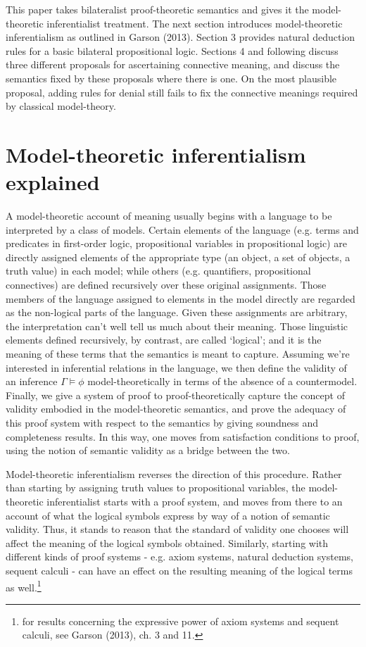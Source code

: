 \documentclass[]{article}
\begin{document}
This paper takes bilateralist proof-theoretic semantics and gives it the model-theoretic inferentialist treatment. The next section introduces model-theoretic inferentialism as outlined in Garson (2013). Section 3 provides natural deduction rules for a basic bilateral propositional logic. Sections 4 and following discuss three different proposals for ascertaining connective meaning, and discuss the semantics fixed by these proposals where there is one. On the most plausible proposal, adding rules for denial still fails to fix the connective meanings required by classical model-theory.

\section{Model-theoretic inferentialism explained}
A model-theoretic account of meaning usually begins with a language to be interpreted by a class of models. Certain elements of the language (e.g. terms and predicates in first-order logic, propositional variables in propositional logic) are directly assigned elements of the appropriate type (an object, a set of objects, a truth value) in each model; while others (e.g. quantifiers, propositional connectives) are defined recursively over these original assignments. Those members of the language assigned to elements in the model directly are regarded as the non-logical parts of the language. Given these assignments are arbitrary, the interpretation can't well tell us much about their meaning. Those linguistic elements defined recursively, by contrast, are called `logical'; and it is the meaning of these terms that the semantics is meant to capture. Assuming we're interested in inferential relations in the language, we then define the validity of an inference $\Gamma  \models \phi$ model-theoretically in terms of the absence of a countermodel. Finally, we give a system of proof to proof-theoretically capture the concept of validity embodied in the model-theoretic semantics, and prove the adequacy of this proof system with respect to the semantics by giving soundness and completeness results. In this way, one moves from satisfaction conditions to proof, using the notion of semantic validity as a bridge between the two.

Model-theoretic inferentialism reverses the direction of this procedure. Rather than starting by assigning truth values to propositional variables, the model-theoretic inferentialist starts with a proof system, and moves from there to an account of what the logical symbols express by way of a notion of semantic validity. Thus, it stands to reason that the standard of validity one chooses will affect the meaning of the logical symbols obtained. Similarly, starting with different kinds of proof systems - e.g. axiom systems, natural deduction systems, sequent calculi - can have an effect on the resulting meaning of the logical terms as well.\footnote{for results concerning the expressive power of axiom systems and sequent calculi, see Garson (2013), ch. 3 and 11.}
\end{document}
